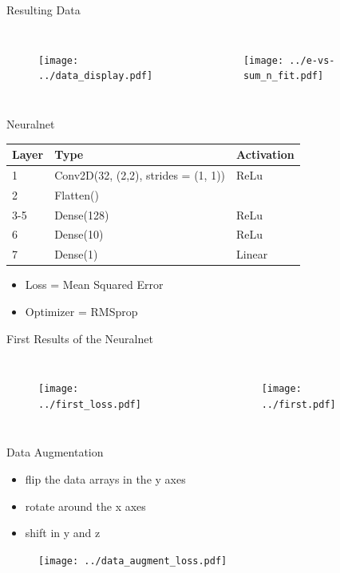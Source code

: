 \documentclass[10pt]{beamer}
\begin{document}
\begin{frame}{Resulting Data}
  \begin{columns}
    \begin{figure}[htp]
      \texttt{[image: ../data\_display.pdf]}
    \end{figure}
    \begin{figure}[htp]
      \texttt{[image: ../e-vs-sum\_n\_fit.pdf]}
    \end{figure}
  \end{columns}
\end{frame}

\begin{frame}{Neuralnet}
  \begin{tabular}{l|l|l}
    Layer & Type                                & Activation \\ \hline
    1     & Conv2D(32, (2,2), strides = (1, 1)) & ReLu       \\
    2     & Flatten()                           &            \\
    3-5   & Dense(128)                          & ReLu       \\
    6     & Dense(10)                           & ReLu       \\
    7     & Dense(1)                            & Linear    
  \end{tabular}
  \begin{itemize}
  \item Loss = Mean Squared Error
  \item Optimizer = RMSprop
  \end{itemize}
\end{frame}

\begin{frame}{First Results of the Neuralnet}
  \begin{columns}
    \begin{figure}[htp]
      \texttt{[image: ../first\_loss.pdf]}
    \end{figure}
    \begin{figure}[htp]
      \texttt{[image: ../first.pdf]}
    \end{figure}
  \end{columns}
\end{frame}

\begin{frame}{Data Augmentation}
  \begin{itemize}
  \item flip the data arrays in the y axes
  \item rotate around the x axes
  \item shift in y and z
  \end{itemize}
    \begin{figure}[htp]
      \texttt{[image: ../data\_augment\_loss.pdf]}
    \end{figure}
\end{frame}
\end{document}

